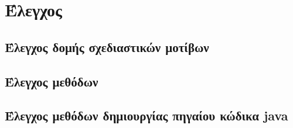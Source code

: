 \chapter{Έλεγχος}
\label{ch:testing}


\section{Έλεγχος δομής σχεδιαστικών μοτίβων}
\label{sec:patternTesting}
\section{Έλεγχος μεθόδων }
\label{sec:patternManagerTesting}
\section{Έλεγχος μεθόδων δημιουργίας πηγαίου κώδικα java}
\label{sec:patternGeneratorTesting}
